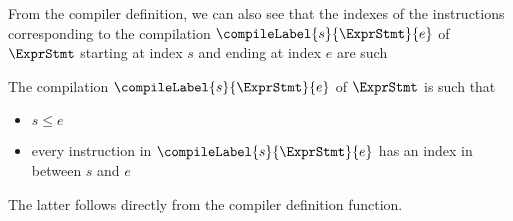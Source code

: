 

From the compiler definition, we can also see that the indexes of the instructions corresponding to the compilation 
$\compileLabel{s}{\ExprStmt}{e}$ 
of $ \ExprStmt$ starting at index $s$ and ending at index $e$ are such 

\begin{compPropApp}\label{compile:prop:compPropIndex}
The compilation $\compileLabel{s}{\ExprStmt}{e}$ 
of $ \ExprStmt$ is such that 

\begin{itemize}
 \item $s \le e$
 \item every instruction in $\compileLabel{s}{\ExprStmt}{e}$  has an index  in between $s$ and $e$
\end{itemize}
\end{compPropApp}
The latter follows directly from the compiler definition function.
 
